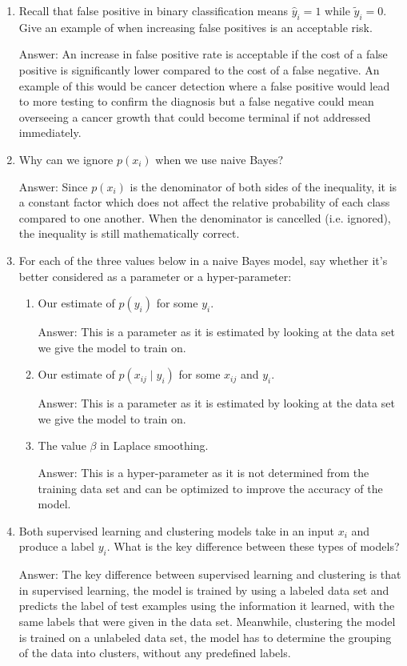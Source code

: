 \documentclass{article}
\newcommand{\gre}[1]{\textcolor{gre}{#1}}
\newcommand\ans[1]{\par\gre{Answer: #1}}
\begin{document}
\begin{enumerate}
        \item Recall that false positive in binary classification means $\hat y_i=1$ while $\tilde y_i = 0$. Give an example of when increasing false positives is an acceptable risk.

        \ans{An increase in false positive rate is acceptable if the cost of a false positive is significantly lower compared to the cost of a false negative. An example of this would be cancer detection where a false positive would lead to more testing to confirm the diagnosis but a false negative could mean overseeing a cancer growth that could become terminal if not addressed immediately.}

        \item Why can we ignore $p(x_i)$ when we use naive Bayes?

        \ans{Since $p(x_i)$ is the denominator of both sides of the inequality, it is a constant factor which does not affect the relative probability of each class compared to one another. When the denominator is cancelled (i.e. ignored), the inequality is still mathematically correct.}
        \newpage

        \item For each of the three values below in a naive Bayes model, say whether it's better considered as a parameter or a hyper-parameter:
        \begin{enumerate}
            \item Our estimate of $p(y_i)$ for some $y_i$.
            \ans{This is a parameter as it is estimated by looking at the data set we give the model to train on.}
            \item Our estimate of $p(x_{ij} \mid y_i)$ for some $x_{ij}$ and $y_i$.
            \ans{This is a parameter as it is estimated by looking at the data set we give the model to train on.}
            \item The value $\beta$ in Laplace smoothing.
            \ans{This is a hyper-parameter as it is not determined from the training data set and can be optimized to improve the accuracy of the model.}
        \end{enumerate}

        \item Both supervised learning and clustering models take in an input $x_i$ and produce a label $y_i$. What is the key difference between these types of models?

        \ans{The key difference between supervised learning and clustering is that in supervised learning, the model is trained by using a labeled data set and predicts the label of test examples using the information it learned, with the same labels that were given in the data set. Meanwhile, clustering the model is trained on a unlabeled data set, the model has to determine the grouping of the data into clusters, without any predefined labels.}


\end{enumerate}
\end{document}
